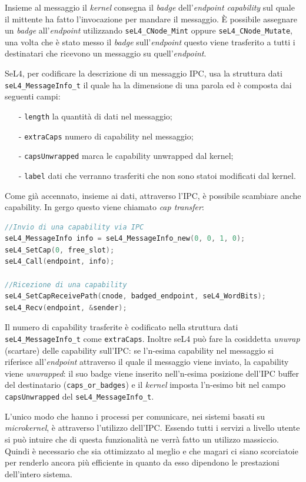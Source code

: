 Insieme al messaggio il \textit{kernel} consegna il \textit{badge} dell'\textit{endpoint capability} sul quale il mittente ha fatto l'invocazione per mandare il messaggio. È possibile assegnare un \textit{badge} all'\textit{endpoint} utilizzando \texttt{seL4\_CNode\_Mint} oppure \texttt{seL4\_CNode\_Mutate}, una volta che è stato messo il \textit{badge} sull'\textit{endpoint} questo viene trasferito a tutti i destinatari che ricevono un messaggio su quell'\textit{endpoint}.

SeL4, per codificare la descrizione di un messaggio IPC, usa la struttura dati \texttt{seL4\_MessageInfo\_t} il quale ha la dimensione di una parola ed è composta dai seguenti campi:
\begin{itemize}
	\item[-] \texttt{length} la quantità di dati nel messaggio;
	\item[-] \texttt{extraCaps} numero di capability nel messaggio;
	\item[-] \texttt{capsUnwrapped} marca le capability unwrapped dal kernel;
	\item[-] \texttt{label} dati che verranno trasferiti che non sono statoi modificati dal kernel.
\end{itemize}

Come già accennato, insieme ai dati, attraverso l'IPC, è possibile scambiare anche capability. In gergo questo viene chiamato \textit{cap transfer}:
\begin{lstlisting}[language=C++]
//Invio di una capability via IPC
seL4_MessageInfo info = seL4_MessageInfo_new(0, 0, 1, 0);
seL4_SetCap(0, free_slot);
seL4_Call(endpoint, info);

//Ricezione di una capability
seL4_SetCapReceivePath(cnode, badged_endpoint, seL4_WordBits);
seL4_Recv(endpoint, &sender);
\end{lstlisting}

Il numero di capability trasferite è codificato nella struttura dati \texttt{seL4\_MessageInfo\_t} come \texttt{extraCaps}.
Inoltre seL4 può fare la cosiddetta \textit{unwrap} (scartare) delle capability sull'IPC: se l'n-esima capability nel messaggio si riferisce all'\textit{endpoint} attraverso il quale il messaggio viene inviato, la capability viene \textit{unwrapped}: il suo badge viene inserito nell'n-esima posizione dell'IPC buffer del destinatario (\texttt{caps\_or\_badges}) e il \textit{kernel} imposta l'n-esimo bit nel campo \texttt{capsUnwrapped} del \texttt{seL4\_MessageInfo\_t}.

L'unico modo che hanno i processi per comunicare, nei sistemi basati su \textit{microkernel}, è attraverso l'utilizzo dell'IPC. Essendo tutti i servizi a livello utente si può intuire che di questa funzionalità ne verrà fatto un utilizzo massiccio. Quindi è necessario che sia ottimizzato al meglio e che magari ci siano scorciatoie per renderlo ancora più efficiente in quanto da esso dipendono le prestazioni dell'intero sistema.


